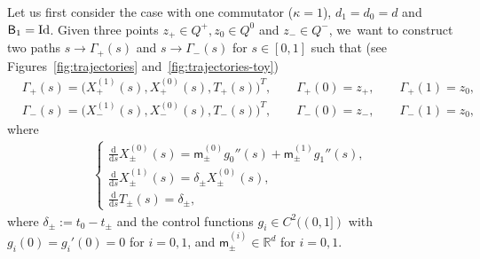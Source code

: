 \documentclass[JEP,XML,SOM,Unicode,NoFloatCountersInSection,published]{cedram}
\theoremstyle{definition}
\newcommand\R{{\mathbb R}}
\newcommand{\sB}{{\mathsf B}}
\newcommand{\I}{\textup{Id}}\let\Id\I
\newcommand\ds{{\frac{\mathrm d}{\mathrm ds}}}
\begin{document}
Let us first consider the case with one commutator ($\kappa=1$),
$d_1=d_0=d$ and $\sB_1=\I$. Given three points
$z_+ \in Q^+, z_0 \in Q^0$ and $z_- \in Q^-$, we~want to
construct two paths $s \rightarrow \Gamma_+(s)$ and
$s \rightarrow \Gamma_-(s)$ for $s \in [0, 1]$ such that (see
Figures~\ref{fig:trajectories} and~\ref{fig:trajectories-toy})
\begin{equation*}
\begin{aligned}
& \Gamma_+(s) = \bigl(X^{(1)}_+(s), X^{(0)}_+(s),
T_+(s)\bigr)^T, \qquad \Gamma_+(0) = z_+, \qquad \Gamma_+(1) =
z_0,\\
& \Gamma_-(s) = \bigl(X^{(1)}_-(s), X^{(0)}_-(s),
T_-(s)\bigr)^T, \qquad \Gamma_-(0) = z_-, \qquad \Gamma_-(1) =
z_0,
\end{aligned}
\end{equation*}
where
\begin{equation}
\label{eq:control}
\begin{aligned}
\begin{cases}
\ds X^{(0)}_{\pm}(s)
= \mathsf m_\pm ^{(0)}
g_0''(s) +\mathsf m^{(1)}_\pm
g_1 ''(s), \\[2mm]
\ds X^{(1)}_\pm(s) = \delta_\pm X^{(0)}_\pm(s),\\[2mm]
\ds T_\pm(s) = \delta_\pm,
\end{cases}
\end{aligned}
\end{equation}
where $\delta_\pm := t_0 - t_\pm$ and the control functions
$g_i \in C^2((0,1])$ with $g_i(0)=g_i'(0)=0$ for $i=0,1$, and
$\mathsf m^{(i)} _\pm \in \R^d$ for $i=0,1$.
\end{document}
